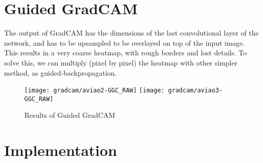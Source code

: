 \section{Guided GradCAM}

The output of GradCAM has the dimensions of the last convolutional layer of the network, and has to be upsampled to be overlayed on top of the input image. This results in a very coarse heatmap, with rough borders and lost details. To solve this, we can multiply (pixel by pixel) the heatmap with other simpler method, as guided-backpropagation. 

\begin{figure}
    \centering
    \texttt{[image: gradcam/aviao2-GGC\_RAW]}
    \texttt{[image: gradcam/aviao3-GGC\_RAW]}
    \caption{Results of Guided GradCAM}
\end{figure}


\section{Implementation}

